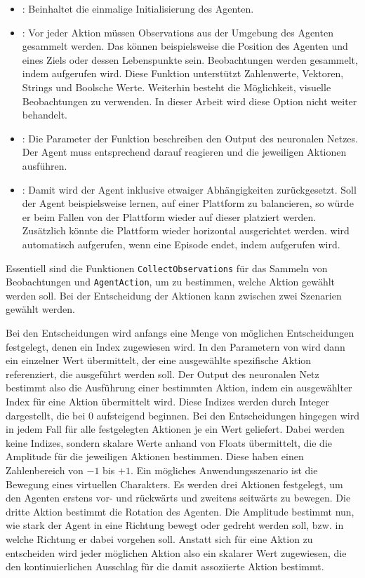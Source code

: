 \newpage
\begin{itemize}
    \item {}: Beinhaltet die einmalige Initialisierung des Agenten.
    \item {}: Vor jeder Aktion müssen Observations aus der Umgebung des Agenten gesammelt werden. Das können beispielsweise die Position des Agenten und eines Ziels oder dessen Lebenspunkte sein. Beobachtungen werden gesammelt, indem  aufgerufen wird. Diese Funktion unterstützt Zahlenwerte, Vektoren, Strings und Boolsche Werte. Weiterhin besteht die Möglichkeit, visuelle Beobachtungen zu verwenden. In dieser Arbeit wird diese Option nicht weiter behandelt.
    \item {}: Die Parameter der Funktion beschreiben den Output des neuronalen Netzes. Der Agent muss entsprechend darauf reagieren und die jeweiligen Aktionen ausführen.
    \item {}: Damit wird der Agent inklusive etwaiger Abhängigkeiten zurückgesetzt. Soll der Agent beispielsweise lernen, auf einer Plattform zu balancieren, so würde er beim Fallen von der Plattform wieder auf dieser platziert werden. Zusätzlich könnte die Plattform wieder horizontal ausgerichtet werden.  wird automatisch aufgerufen, wenn eine Episode endet, indem  aufgerufen wird.
\end{itemize}

Essentiell sind die Funktionen \texttt{CollectObservations} für das Sammeln von Beobachtungen und \texttt{AgentAction}, um zu bestimmen, welche Aktion gewählt werden soll. Bei der Entscheidung der Aktionen kann zwischen zwei Szenarien gewählt werden. 

Bei den  Entscheidungen wird anfangs eine Menge von möglichen Entscheidungen festgelegt, denen ein Index zugewiesen wird. In den Parametern von  wird dann ein einzelner Wert übermittelt, der eine ausgewählte spezifische Aktion referenziert, die ausgeführt werden soll. Der Output des neuronalen Netz bestimmt also die Ausführung einer bestimmten Aktion, indem ein ausgewählter Index für eine Aktion übermittelt wird. Diese Indizes werden durch Integer dargestellt, die bei $0$ aufsteigend beginnen.
Bei den  Entscheidungen hingegen wird in jedem Fall für alle festgelegten Aktionen je ein Wert geliefert. Dabei werden keine Indizes, sondern skalare Werte anhand von Floats übermittelt, die die Amplitude für die jeweiligen Aktionen bestimmen. Diese haben einen Zahlenbereich von $-1$ bis $+1$. Ein mögliches Anwendungsszenario ist die Bewegung eines virtuellen Charakters. Es werden drei Aktionen festgelegt, um den Agenten erstens vor- und rückwärts und zweitens seitwärts zu bewegen. Die dritte Aktion bestimmt die Rotation des Agenten. Die Amplitude bestimmt nun, wie stark der Agent in eine Richtung bewegt oder gedreht werden soll, bzw. in welche Richtung er dabei vorgehen soll. Anstatt sich für eine Aktion zu entscheiden wird jeder möglichen Aktion also ein skalarer Wert zugewiesen, die den kontinuierlichen Ausschlag für die damit assoziierte Aktion bestimmt.


